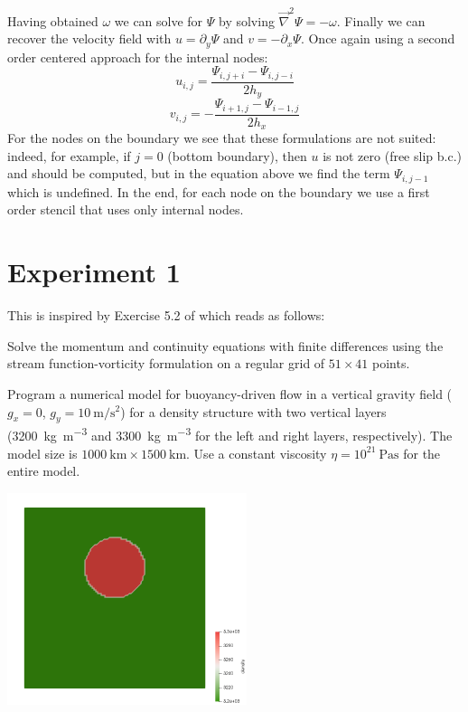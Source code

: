 Having obtained $\omega$ we can solve for $\Psi$ by solving
$\vec\nabla^2 \Psi = -\omega$.
Finally we can recover the velocity field with $u=\partial_y \Psi$ and $v=-\partial_x \Psi$.
Once again using a second order centered approach for the internal nodes:
\[
u_{i,j} = \frac{\Psi_{i,j+i}-\Psi_{i,j-i}}{2 h_y}
\]
\[
v_{i,j} = - \frac{\Psi_{i+1,j}-\Psi_{i-1,j}}{2 h_x}
\]
For the nodes on the boundary we see that these formulations are not suited:
indeed, for example, if $j=0$ (bottom boundary), then $u$ is not zero (free slip b.c.)
and should be computed, but in the equation above we find the term $\Psi_{i,j-1}$ 
which is undefined. In the end, 
for each node on the boundary we use a first order stencil that uses only 
internal nodes.

\section*{Experiment 1}

This is inspired by Exercise 5.2 of \textcite{gery19book} which reads as 
follows:

Solve the momentum and continuity equations with ﬁnite differences using the stream
function-vorticity formulation 
on a regular grid of $51\times 41$ points. 

Program a numerical model for buoyancy-driven ﬂow in a vertical 
gravity ﬁeld ($g_x=0$, $g_y=10~\si{\meter\per\square\second}$) 
for a density structure with two vertical layers 
(3200~\si{\kg\per\cubic\meter} and 3300~\si{\kg\per\cubic\meter} 
for the left and right layers, respectively). The model size is 
$1000~\si{\km} \times 1500~\si{\km}$.
Use a constant viscosity $\eta = 10^{21}~\si{\pascal\second}$ 
for the entire model.

\begin{center}
\includegraphics[width=7cm]{python_codes/fieldstone_153/results/exp1/rho}
\end{center}


